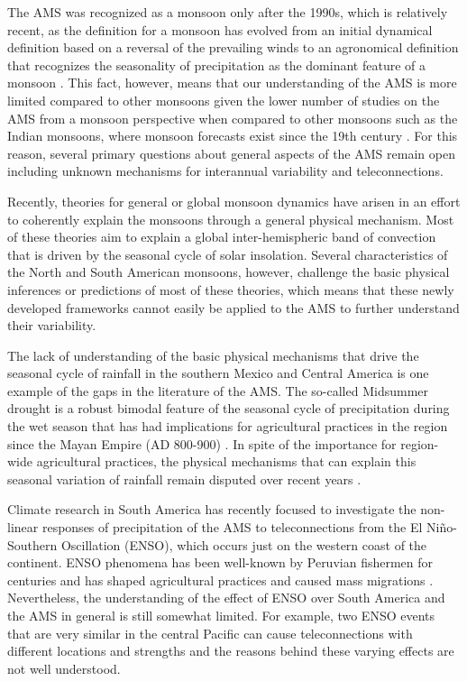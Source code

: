 The AMS was recognized as a monsoon only after the 1990s, which is relatively recent, as the definition for a monsoon has evolved from an initial dynamical definition based on a reversal of the prevailing winds to an agronomical definition that recognizes the seasonality of precipitation as the dominant feature of a monsoon \citep{wang2017,gadgil2018}. This fact, however, means that our understanding of the AMS is more limited compared to other monsoons given the lower number of studies on the AMS from a monsoon perspective when compared to other monsoons such as the Indian monsoons, where monsoon forecasts exist since the 19th century \citep{blanford}.
For this reason, several primary questions about general aspects of the AMS remain open including unknown mechanisms for interannual variability and teleconnections.

Recently, theories for general or global monsoon dynamics \citep{bordoni2008monsoons,biasutti2018global,hill2019,geen2020} have arisen in an effort to coherently explain the monsoons through a general physical mechanism. Most of these theories aim to explain a global inter-hemispheric band of convection that is driven by the seasonal cycle of solar insolation. Several characteristics of the North and South American monsoons, however, challenge the basic physical inferences or predictions of most of these theories, which means that these newly developed frameworks cannot  easily be applied to the AMS to further understand their variability. 


The lack of understanding of the basic physical mechanisms that drive the seasonal cycle of rainfall in the southern Mexico and Central America is one example of the gaps in the literature of the AMS. The so-called Midsummer drought is a robust bimodal feature of the seasonal cycle of precipitation during the wet season that has had implications for agricultural practices in the region since the Mayan Empire (AD 800-900) \citep{jobbova2018ritual}. In spite of the importance for region-wide agricultural practices, the physical mechanisms that can explain this seasonal variation of rainfall remain disputed over recent years \citep{karnauskas2013,herrera2015,zermeno2019}. 

Climate research in South America has recently focused to investigate the non-linear responses of precipitation of the AMS to teleconnections from the El Niño-Southern Oscillation (ENSO), which occurs just on the western coast of the continent. ENSO phenomena has been well-known by Peruvian fishermen for centuries and has shaped agricultural practices and caused mass migrations \citep{caramanica2020nino}. Nevertheless, the understanding of the effect of ENSO over South America and the AMS in general is still somewhat limited. For example, two ENSO events that are very similar in the central Pacific can cause teleconnections with different locations and strengths and the reasons behind these varying effects are not well understood. 

